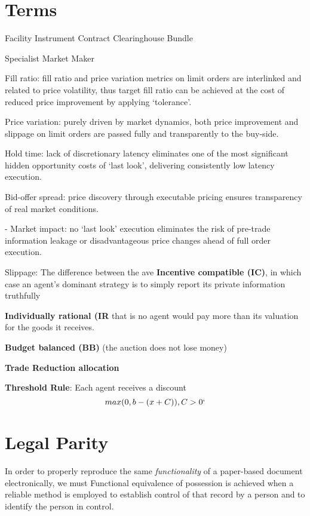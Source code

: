 \documentclass{article}
\begin{document}
 
\section{Terms}

Facility
Instrument
Contract
Clearinghouse
Bundle

Specialist
Market Maker

Fill ratio: fill ratio and price variation metrics on limit orders are interlinked and related
 to price volatility, thus target fill ratio can be achieved at the cost of reduced price
 improvement by applying ‘tolerance’.

Price variation: purely driven by market dynamics, both price improvement and slippage on
 limit orders are passed fully and transparently to the buy-side.

Hold time: lack of discretionary latency eliminates one of the most significant hidden
 opportunity costs of ‘last look’, delivering consistently low latency execution.

Bid-offer spread: price discovery through executable pricing ensures transparency of real
 market conditions.

- Market impact: no ‘last look’ execution eliminates the risk of pre-trade information leakage or disadvantageous price changes ahead of full order execution.

Slippage: The difference between the ave
\textbf{Incentive compatible (IC)}, in which case an agent’s dominant strategy
is to simply report its private information truthfully

\textbf{Individually rational (IR} that is no agent would pay more than its valuation for the goods it receives.

\textbf{Budget balanced (BB)} (the auction does not lose money)

\textbf{Trade Reduction allocation}

\textbf{Threshold Rule}: Each agent receives a discount
\[max (0, b - (x + C))  , C > 0`\]

\section{Legal Parity}

	In order to properly reproduce the same \textit{functionality} of a paper-based document electronically, we must  Functional equivalence of possession is achieved when a reliable method is employed to establish control of that record by a person and to identify the person in control. 
\end{document}
